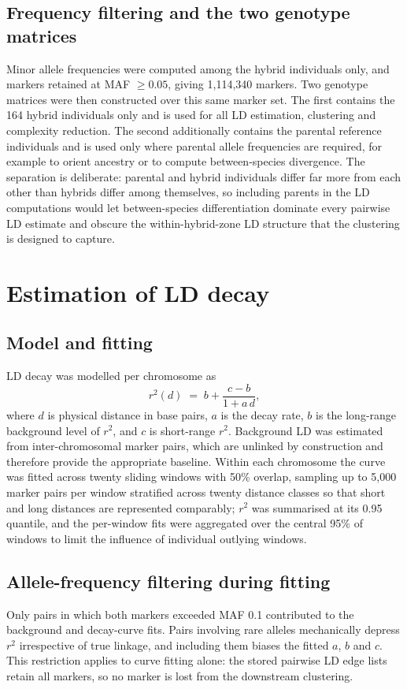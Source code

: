 \documentclass[11pt]{article}
\newcommand{\rsq}{\ensuremath{r^{2}}}
\begin{document}
\subsection{Frequency filtering and the two genotype matrices}
Minor allele frequencies were computed among the hybrid individuals only, and
markers retained at MAF $\ge 0.05$, giving 1{,}114{,}340 markers. Two genotype
matrices were then constructed over this same marker set. The first contains the
164 hybrid individuals only and is used for all LD estimation, clustering and
complexity reduction. The second additionally contains the parental reference
individuals and is used only where parental allele frequencies are required, for
example to orient ancestry or to compute between-species divergence. The
separation is deliberate: parental and hybrid individuals differ far more from
each other than hybrids differ among themselves, so including parents in the LD
computations would let between-species differentiation dominate every pairwise
LD estimate and obscure the within-hybrid-zone LD structure that the clustering
is designed to capture.

\section{Estimation of LD decay}

\subsection{Model and fitting}
LD decay was modelled per chromosome as
\begin{equation}
\rsq(d) \;=\; b + \frac{c-b}{1 + a\,d},
\end{equation}
where $d$ is physical distance in base pairs, $a$ is the decay rate, $b$ is the
long-range background level of \rsq{}, and $c$ is short-range \rsq{}. Background
LD was estimated from inter-chromosomal marker pairs, which are unlinked by
construction and therefore provide the appropriate baseline. Within each
chromosome the curve was fitted across twenty sliding windows with 50\% overlap,
sampling up to 5{,}000 marker pairs per window stratified across twenty distance
classes so that short and long distances are represented comparably; \rsq{} was
summarised at its 0.95 quantile, and the per-window fits were aggregated over
the central 95\% of windows to limit the influence of individual outlying
windows.

\subsection{Allele-frequency filtering during fitting}
Only pairs in which both markers exceeded MAF 0.1 contributed to the background
and decay-curve fits. Pairs involving rare alleles mechanically depress \rsq{}
irrespective of true linkage, and including them biases the fitted $a$, $b$ and
$c$. This restriction applies to curve fitting alone: the stored pairwise LD
edge lists retain all markers, so no marker is lost from the downstream
clustering.
\end{document}
